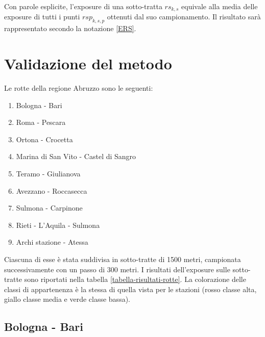 \noindent Con parole esplicite, l'exposure di una sotto-tratta $rs_{k,s}$ equivale alla media delle exposure di tutti i punti $rsp_{k,s,p}$ ottenuti dal suo campionamento. Il risultato sarà rappresentato secondo la notazione \ref{ERS}.

\section{Validazione del metodo}
Le rotte della regione Abruzzo sono le seguenti:
\begin{enumerate}
	\item Bologna - Bari
	\item Roma - Pescara
	\item Ortona - Crocetta
	\item Marina di San Vito - Castel di Sangro
	\item Teramo - Giulianova
	\item Avezzano - Roccasecca
	\item Sulmona - Carpinone
	\item Rieti - L'Aquila - Sulmona
	\item Archi stazione - Atessa
\end{enumerate}
Ciascuna di esse è stata suddivisa in sotto-tratte di 1500 metri, campionata successivamente con un passo di 300 metri. 
I risultati dell'exposure sulle sotto-tratte sono riportati nella tabella \ref{tabella-risultati-rotte}. La colorazione delle classi di appartenenza è la stessa di quella vista per le stazioni (rosso classe alta, giallo classe media e verde classe bassa).

\subsection{Bologna - Bari}

